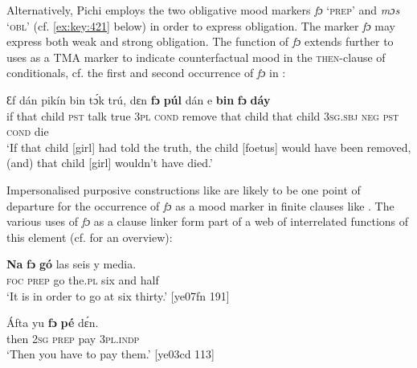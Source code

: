 Alternatively, Pichi employs the two obligative mood markers \textit{fɔ} ‘\textsc{prep}’  and \textit{mɔs} ‘\textsc{obl}’ (cf. \ref{ex:key:421} below) in order to express obligation. The marker \textit{fɔ} may express both weak and strong obligation. The function of \textit{fɔ} extends further to uses as a TMA marker to indicate counterfactual mood in the \textsc{then-}clause of conditionals, cf. the first and second occurrence of \textit{fɔ} in :



\ea%
    \label{ex:key:416}
\gll
Ɛf  dán    pikín  bin  tɔ́k  trú,    dɛn  \textbf{fɔ}    \textbf{púl}   dán  
  e  \textbf{bin}\textstylePichiexamplenumberZchnZchn{} \textbf{fɔ}    \textbf{dáy}\\
if  that    child  \textsc{pst}  talk  true    \textsc{3pl}  \textsc{cond}    remove  that child 
that    child  \textsc{3sg.sbj}  \textsc{neg}  \textsc{pst}  \textsc{cond}    die\\

\glt ‘If that child [girl] had told the truth, the child [foetus] would have been removed, 
(and) that child [girl] wouldn’t have died.’\textstylePichiglossZchn{ [ab03ay 121]}
\z

Impersonalised purposive constructions like  are likely to be one point of departure for the occurrence of \textit{fɔ} as a mood marker in finite clauses like . The various uses of \textit{fɔ} as a clause linker form part of a web of interrelated functions of this element (cf.  for an overview): 


\ea%
    \label{ex:key:417}
    \gll \textbf{Na}  \textbf{fɔ}  \textbf{gó}  las    seis  y  media.\\
\textsc{foc}  \textsc{prep}  go  the\textsc{.pl}  six  and  half\\

\glt ‘It is in order to go at six thirty.’ [ye07fn 191]
\z


\ea%
    \label{ex:key:418}
    \gll \'{A}fta    yu  \textbf{fɔ}  \textbf{pé}  dɛ́n.\\
then  \textsc{2sg}  \textsc{prep}  pay  \textsc{3pl.indp}\\

\glt ‘Then you have to pay them.’ [ye03cd 113]
\z

